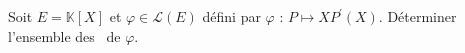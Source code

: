 Soit $E=\mathbb{K}[X]$ et $\varphi \in \mathcal{L}(E)$ défini par $\varphi$ : $P\mapsto X P^{\prime}(X)$. Déterminer l'ensemble des \valps\ de $\varphi$.

